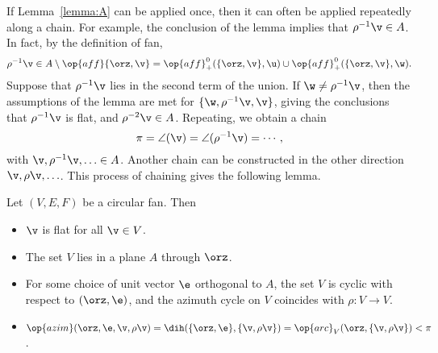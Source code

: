 If Lemma~\ref{lemma:A} can be applied once, then it can often be
applied repeatedly along a chain.  For example, the conclusion of the
lemma implies that $\rho^{-1} \v \in A$.  In fact, by the definition
of fan,
\begin{displaymath}
  \rho^{-1}\v \in A \setminus \op{aff}\{\orz,\v\} 
= \op{aff}^0_+(\{\orz,\v\},\u) \cup \op{aff}^0_+(\{\orz,\v\},\w).
\end{displaymath}
Suppose that $\rho^{-1} \v$ lies in the second term of the union.  If
$\w\ne \rho^{-1}\v$, then the assumptions of the lemma are met for
$\{\w,\rho^{-1} \v,\v\}$, giving the conclusions that $\rho^{-1} \v$
is flat, and $\rho^{-2}\v\in A$.  Repeating, we obtain a chain
\begin{displaymath}
\pi=\angle(\v) = \angle(\rho^{-1} \v) = \cdots,
\end{displaymath}
with $\v,\rho^{-1}\v,\ldots\in A$.  Another chain can be constructed
in the other direction $\v,\rho \v,\ldots$.  This process of chaining
gives the following lemma.

\begin{lemma}
\label{lemma:circular}
Let $(V,E,F)$ be a circular fan. Then
\begin{itemize}
\item $\v$ is flat for all $\v\in V$.
\item The set $V$ lies in a plane $A$ through $\orz$.
\item For some choice of unit vector $\e$ orthogonal to $A$, the set
$V$ is cyclic with respect to $(\orz,\e)$, and the azimuth cycle on
$V$ coincides with $\rho:V\to V$.  
\item 
$
\op{azim}(\orz,\e,\v,\rho\v) = \dih(\{\orz,\e\},\{\v,\rho\v\})
=\op{arc}_V(\orz,\{\v,\rho \v\}) <\pi
$.
\end{itemize}
\end{lemma}

